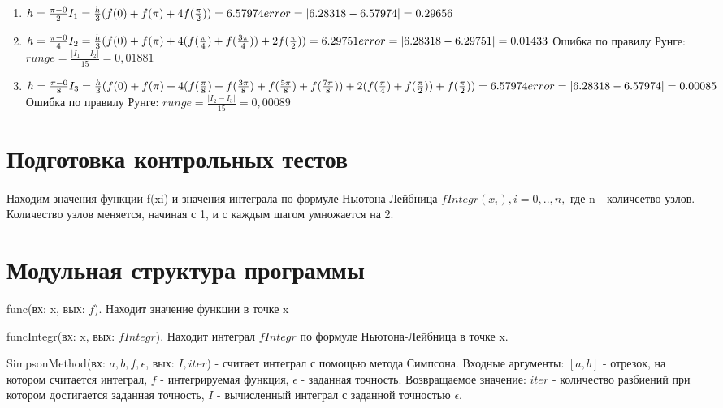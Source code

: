 \documentclass{article}
\begin{document}
	\begin{enumerate}
		\item $h = \frac{\pi - 0}{2}\\
		I_1 = \frac{h}{3}(f(0)+f(\pi)+4f(\frac{\pi}{2})) = 6.57974\\
		error = |6.28318 - 6.57974| = 0.29656$ \\
		\item $h = \frac{\pi - 0}{4}\\
		I_2 = \frac{h}{3}(f(0)+f(\pi)+4(f(\frac{\pi}{4}) + f(\frac{3\pi}{4}))+ 2f(\frac{\pi}{2})) = 6.29751\\
		error = |6.28318 - 6.29751| =  0.01433\\$ 
		Ошибка по правилу Рунге:
		$runge = \frac{|I_1- I_2|}{15} = 0,01881$
		\item $h = \frac{\pi - 0}{8}\\
		I_3 = \frac{h}{3}(f(0)+f(\pi)+4(f(\frac{\pi}{8}) + f(\frac{3\pi}{8}) + f(\frac{5\pi}{8}) + f(\frac{7\pi}{8}))+ 2(f(\frac{\pi}{4})+ f(\frac{\pi}{2})) + f(\frac{\pi}{2})) = 6.57974\\
		error = |6.28318 - 6.57974| =  0.00085\\$
		Ошибка по правилу Рунге:
		$runge = \frac{|I_2- I_3|}{15} = 0,00089$
	\end{enumerate}
	
	\section{Подготовка контрольных тестов}
	\paragraph{}Находим значения функции f(xi) и значения интеграла по
	формуле Ньютона-Лейбница $fIntegr(x_i), i = 0, .., n,$ где n - количсетво узлов. Количество узлов меняется, начиная с 1, и
	с каждым шагом умножается на 2.
	
	\section{Модульная структура программы}
	func(вх: x, вых: $f$). Находит значение функции в точке x
	
	funcIntegr(вх: x, вых: $fIntegr$). Находит интеграл $fIntegr$
	по формуле Ньютона-Лейбница в точке x.
	
	
	SimpsonMethod(вх: $a, b, f, \epsilon$, вых: $I, iter$) - считает интеграл с помощью метода Симпсона. Входные аргументы: $[a,b]$ - отрезок, на котором считается интеграл, $f$ - интегрируемая функция, $\epsilon$ - заданная точность. Возвращаемое значение: $iter$ - количество разбиений при котором достигается заданная точность, $I$ - вычисленный интеграл с заданной точностью $\epsilon$.
	
\end{document}
